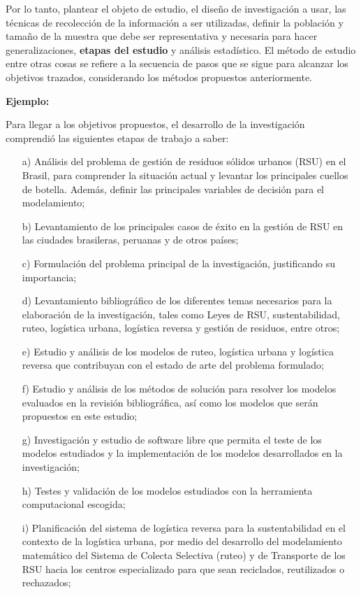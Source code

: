 \documentclass[a4paper, 12pt]{article}
\begin{document}
Por lo tanto, plantear el objeto de estudio, el diseño de investigación a usar, las técnicas de recolección de la información a ser utilizadas, definir la población y tamaño de la muestra que debe ser representativa y necesaria para hacer generalizaciones, {\bf etapas del estudio} y análisis estadístico. El método de estudio entre otras cosas se refiere a la secuencia de pasos que se sigue para alcanzar los objetivos trazados, considerando los métodos propuestos anteriormente.\par
\vskip 0.3cm
{\bf Ejemplo:}\par
\vskip 0.1cm
Para llegar a los objetivos propuestos, el desarrollo de la investigación comprendió las siguientes etapas de trabajo a saber:
\begin{enumerate}
\item[a)] Análisis del problema de gestión de residuos sólidos urbanos (RSU) en el Brasil, para comprender la situación actual y levantar los principales cuellos de botella. Además, definir las principales variables de decisión para el modelamiento;
\item[b)]	Levantamiento de los principales casos de éxito en la gestión de RSU en las ciudades brasileras, peruanas y de otros países;  
\item[c)]	Formulación del problema principal de la investigación, justificando su importancia;
\item[d)]	Levantamiento bibliográfico de los diferentes temas necesarios para la elaboración de la investigación, tales como Leyes de RSU, sustentabilidad, ruteo, logística urbana, logística reversa y gestión de residuos, entre otros;
\item[e)]	Estudio y análisis de los modelos de ruteo, logística urbana y logística reversa que contribuyan con el estado de arte del problema formulado;
\item[f)]	Estudio y análisis de los métodos de solución para resolver los modelos evaluados en la revisión bibliográfica, así como los modelos que serán propuestos en este estudio;
\item[g)]	Investigación y estudio de software libre que permita el teste de los modelos estudiados y la implementación de los modelos desarrollados en la investigación;
\item[h)]	Testes y validación de los modelos estudiados con la herramienta computacional escogida;
\item[i)]	Planificación del sistema de logística reversa para la sustentabilidad en el contexto de la logística urbana, por medio del desarrollo del modelamiento matemático del Sistema de Colecta Selectiva (ruteo) y de Transporte de los RSU hacia los centros especializado para que sean reciclados, reutilizados o rechazados;

\end{enumerate}
\end{document}
